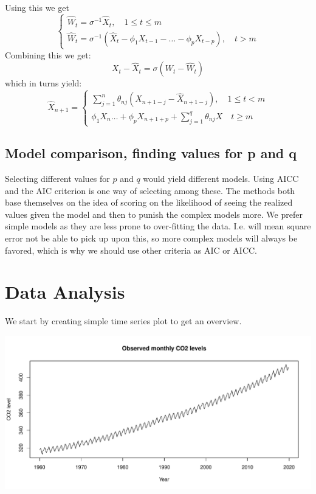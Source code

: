 \documentclass[]{article}
\begin{document}
Using this we get \[
\left\{
                \begin{array}{ll}
                  \hat W_{t} = \sigma^{-1}\hat X_t, \quad 1 \leq t \leq m \\
                  \hat W_{t} = \sigma^{-1}(\hat X_t - \phi_1X_{t-1}-\dots-\phi_pX_{t-p}),\quad t > m
                \end{array}
              \right.
\] Combining this we get: \[X_t - \hat X_t = \sigma(W_t-\hat W_t)\]
which in turns yield: \[
\hat X_{n+1} = \left\{
                \begin{array}{ll}
                  \sum_{j=1}^n \theta _{nj}(X_{n+1-j}-\hat X_{n+1-j}), \quad 1 \leq t < m \\
                  \phi_1X_n \dots + \phi_pX_{n+1+p}+\sum_{j=1}^q\theta_{nj}X\quad t \geq m
                \end{array}
              \right.
\]

\hypertarget{model-comparison-finding-values-for-p-and-q}{%
\subsection{Model comparison, finding values for p and
q}\label{model-comparison-finding-values-for-p-and-q}}

Selecting different values for \(p\) and \(q\) would yield different
models. Using AICC and the AIC criterion is one way of selecting among
these. The methods both base themselves on the idea of scoring on the
likelihood of seeing the realized values given the model and then to
punish the complex models more. We prefer simple models as they are less
prone to over-fitting the data. I.e. will mean square error not be able
to pick up upon this, so more complex models will always be favored,
which is why we should use other criteria as AIC or AICC.

\hypertarget{data-analysis}{%
\section{Data Analysis}\label{data-analysis}}

We start by creating simple time series plot to get an overview.

\begin{center}\includegraphics{Tidsrekkerex4_files/figure-latex/unnamed-chunk-3-1} \end{center}
\end{document}

